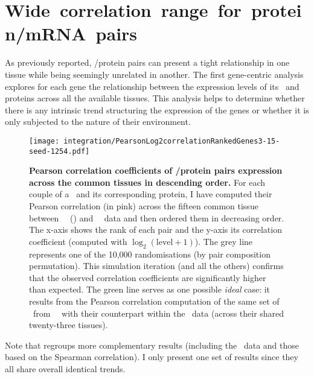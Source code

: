 \section{Wide~correlation~range~for~protein/mRNA~pairs}
As previously reported, %
\mRNA/protein pairs can present
a tight relationship in one tissue
while being seemingly unrelated in another.
The first gene-centric analysis explores for each gene
the relationship between the expression levels of its \mRNAs\ and proteins
across all the available tissues.
This analysis helps to determine
whether there is any intrinsic trend structuring the expression of the genes
or whether it is only subjected to the nature of their environment.\\
\vspace{-\baselineskip}

\begin{figure}[!htpb]
    \texttt{[image: integration/PearsonLog2correlationRankedGenes3-15-seed-1254.pdf]}\centering
    \vspace{-2mm}
    \caption[Pearson correlation coefficients of \mRNA/protein pairs expression
    across the common tissues in descending order]
    {\label{fig:GeneProtCor}\textbf{Pearson correlation coefficients of \mRNA/protein
    pairs expression across the common tissues in descending order.}
    For each couple of a \mRNA\ and its corresponding protein,
    I have computed their Pearson correlation (in pink)
    across the fifteen common tissue
    between \pandey\ \etal\ (\PPKM) and \uhlen\ \etal\ data
    and then ordered them in decreasing order.
    The x-axis shows the rank of each pair
    and the y-axis its correlation coefficient
    (computed with $\log_2(\text{level}+1)$).
    The grey line represents one of the 10,000 randomisations
    (by pair composition permutation).
    This simulation iteration (and all the others) confirms
    that the observed correlation coefficients are
    significantly higher than expected.
    The green line serves as one possible \emph{ideal} case:
    it results from the Pearson correlation computation
    of the same set of \mRNAs\ from \uhlen\ \etal\
    with their counterpart within the \gtex\ data
    (across their shared twenty-three tissues).
    }
\end{figure}

Note that  regroups more complementary results
(including the \gtex\ data and those based on the Spearman correlation).
I only present one set of results
since they all share overall identical trends.

